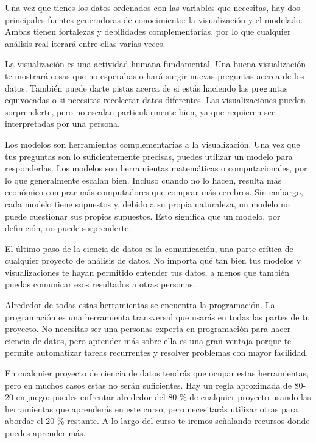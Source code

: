 \documentclass[]{article}
\begin{document}
Una vez que tienes los datos ordenados con las variables que necesitas,
hay dos principales fuentes generadoras de conocimiento: la
visualización y el modelado. Ambas tienen fortalezas y debilidades
complementarias, por lo que cualquier análisis real iterará entre ellas
varias veces.

La visualización es una actividad humana fundamental. Una buena
visualización te mostrará cosas que no esperabas o hará surgir nuevas
preguntas acerca de los datos. También puede darte pistas acerca de si
estás haciendo las preguntas equivocadas o si necesitas recolectar datos
diferentes. Las visualizaciones pueden sorprenderte, pero no escalan
particularmente bien, ya que requieren ser interpretadas por una
persona.

Los modelos son herramientas complementarias a la visualización. Una vez
que tus preguntas son lo suficientemente precisas, puedes utilizar un
modelo para responderlas. Los modelos son herramientas matemáticas o
computacionales, por lo que generalmente escalan bien. Incluso cuando no
lo hacen, resulta más económico comprar más computadores que comprar más
cerebros. Sin embargo, cada modelo tiene supuestos y, debido a su propia
naturaleza, un modelo no puede cuestionar sus propios supuestos. Esto
significa que un modelo, por definición, no puede sorprenderte.

El último paso de la ciencia de datos es la comunicación, una parte
crítica de cualquier proyecto de análisis de datos. No importa qué tan
bien tus modelos y visualizaciones te hayan permitido entender tus
datos, a menos que también puedas comunicar esos resultados a otras
personas.

Alrededor de todas estas herramientas se encuentra la programación. La
programación es una herramienta transversal que usarás en todas las
partes de tu proyecto. No necesitas ser una personas experta en
programación para hacer ciencia de datos, pero aprender más sobre ella
es una gran ventaja porque te permite automatizar tareas recurrentes y
resolver problemas con mayor facilidad.

En cualquier proyecto de ciencia de datos tendrás que ocupar estas
herramientas, pero en muchos casos estas no serán suficientes. Hay un
regla aproximada de 80-20 en juego: puedes enfrentar alrededor del 80 \%
de cualquier proyecto usando las herramientas que aprenderás en este
curso, pero necesitarás utilizar otras para abordar el 20 \% restante. A
lo largo del curso te iremos señalando recursos donde puedes aprender
más.
\end{document}
